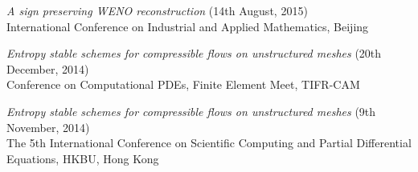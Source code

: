 \documentclass[margin]{res}
\begin{document}
\begin{resume}
              {\it A sign preserving WENO reconstruction} (14th August, 2015)\\
              International Conference on Industrial and Applied Mathematics, Beijing
              
              
              {\it Entropy stable schemes for compressible flows on unstructured meshes} (20th December, 2014)\\
               Conference on Computational PDEs, Finite Element Meet, TIFR-CAM  
              
              {\it Entropy stable schemes for compressible flows on unstructured meshes} (9th November, 2014)\\
               The 5th International Conference on Scientific Computing and Partial Differential Equations, HKBU, Hong Kong              
             
%              


\end{resume}
\end{document}
